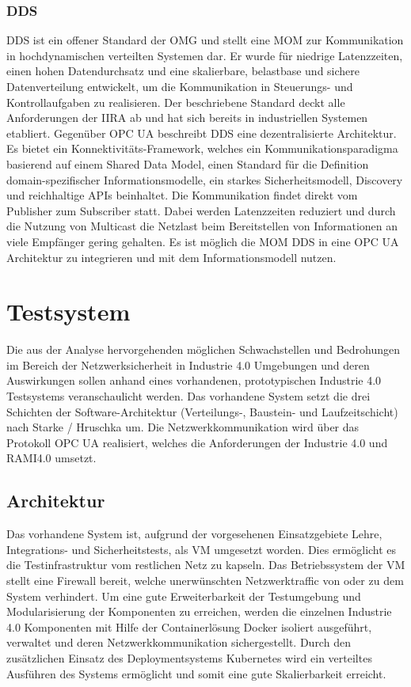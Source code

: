 \subsubsection{\ac{DDS}}
\ac{DDS} ist ein offener Standard der \ac{OMG} und stellt eine \ac{MOM} zur Kommunikation in hochdynamischen verteilten Systemen dar. Er wurde für niedrige Latenzzeiten, einen hohen Datendurchsatz und eine skalierbare, belastbase und sichere Datenverteilung entwickelt, um die Kommunikation in Steuerungs- und Kontrollaufgaben zu realisieren. Der beschriebene Standard deckt alle Anforderungen der \ac{IIRA} ab und hat sich bereits in industriellen Systemen etabliert. Gegenüber \ac{OPC UA} beschreibt \ac{DDS} eine dezentralisierte Architektur. Es bietet ein Konnektivitäts-Framework, welches ein Kommunikationsparadigma basierend auf einem Shared Data Model, einen Standard für die Definition domain-spezifischer Informationsmodelle, ein starkes Sicherheitsmodell, Discovery und reichhal­tige APIs beinhaltet. Die Kommunikation findet direkt vom Publisher zum Subscriber statt. Dabei werden Latenzzeiten reduziert und durch die Nutzung von Multicast die Netzlast beim Bereitstellen von Informationen an viele Empfänger gering gehalten. Es ist möglich die \ac{MOM} \ac{DDS} in eine \ac{OPC UA} Architektur zu integrieren und mit dem Informationsmodell nutzen.

\section{Testsystem}
\label{Grundlagen:Testsystem}
Die aus der Analyse hervorgehenden möglichen Schwachstellen und Bedrohungen im Bereich der Netzwerksicherheit in Industrie 4.0 Umgebungen und deren Auswirkungen sollen anhand eines vorhandenen, prototypischen Industrie 4.0 Testsystems \cite{Weber2018} veranschaulicht werden. Das vorhandene System setzt die drei Schichten der Software-Architektur (Verteilungs-, Baustein- und Laufzeitschicht) nach Starke / Hruschka um. Die Netzwerkkommunikation wird über das Protokoll \ac{OPC UA} realisiert, welches die Anforderungen der Industrie 4.0 und \ac{RAMI4.0} umsetzt.

\subsection{Architektur}
Das vorhandene System ist, aufgrund der vorgesehenen Einsatzgebiete Lehre, Integrations- und Sicherheitstests, als \ac{VM} umgesetzt worden. Dies ermöglicht es die Testinfrastruktur vom restlichen Netz zu kapseln. Das Betriebssystem der \ac{VM} stellt eine Firewall bereit, welche unerwünschten Netzwerktraffic von oder zu dem System verhindert. Um eine gute Erweiterbarkeit der Testumgebung und Modularisierung der Komponenten zu erreichen, werden die einzelnen Industrie 4.0 Komponenten mit Hilfe der Containerlösung Docker isoliert ausgeführt, verwaltet und deren Netzwerkkommunikation sichergestellt. Durch den zusätzlichen Einsatz des Deploymentsystems Kubernetes wird ein verteiltes Ausführen des Systems ermöglicht und somit eine gute Skalierbarkeit erreicht. 

